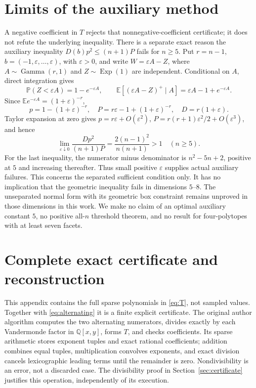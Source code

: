 \documentclass[11pt]{article}
\theoremstyle{remark}\newtheorem{remark}[theorem]{Remark}
\newcommand{\E}{\mathbb E}
\newcommand{\Prob}{\mathbb P}
\numberwithin{equation}{section}
\begin{document}
\section{Limits of the auxiliary method}\label{sec:limits}
A negative coefficient in $T$ rejects that nonnegative-coefficient
certificate; it does not refute the underlying inequality.
There is a separate exact reason the auxiliary inequality
$D(b)p^2\le(n+1)P$ fails for $n\ge5$.
Put $r=n-1$, $b=(-1,\varepsilon,\ldots,\varepsilon)$, with
$\varepsilon>0$, and write $W=\varepsilon A-Z$, where
$A\sim\operatorname{Gamma}(r,1)$ and $Z\sim\operatorname{Exp}(1)$
are independent. Conditional on $A$, direct integration gives
\[
 \Prob(Z<\varepsilon A)=1-e^{-\varepsilon A},\qquad
 \E[(\varepsilon A-Z)^+\mid A]=\varepsilon A-1+e^{-\varepsilon A}.
\]
Since $\E e^{-\varepsilon A}=(1+\varepsilon)^{-r}$,
\begin{equation}\label{eq:corner}
 p=1-(1+\varepsilon)^{-r},\quad
 P=r\varepsilon-1+(1+\varepsilon)^{-r},\quad
 D=r(1+\varepsilon).
\end{equation}
Taylor expansion at zero gives
$p=r\varepsilon+O(\varepsilon^2)$,
$P=r(r+1)\varepsilon^2/2+O(\varepsilon^3)$, and hence
\[
 \lim_{\varepsilon\downarrow0}\frac{Dp^2}{(n+1)P}
 =\frac{2(n-1)^2}{n(n+1)}>1\quad(n\ge5).
\]
For the last inequality, the numerator minus denominator is
$n^2-5n+2$, positive at $5$ and increasing thereafter.
Thus small positive $\varepsilon$ supplies actual auxiliary failures.
This concerns the separated sufficient condition only. It has no
implication that the geometric inequality fails in dimensions $5$--$8$.
The unseparated normal form with its geometric box constraint remains
unproved in those dimensions in this work. We make no claim of an
optimal auxiliary constant $5$, no positive all-$n$ threshold theorem,
and no result for four-polytopes with at least seven facets.

\appendix
\section{Complete exact certificate and reconstruction}\label{app:witness}
This appendix contains the full sparse polynomials in \eqref{eq:T},
not sampled values. Together with \eqref{eq:alternating} it is a finite
explicit certificate. The original author algorithm computes the two
alternating numerators, divides exactly by each Vandermonde factor in
$\mathbb Q[x,y]$, forms $T$, and checks coefficients. Its sparse
arithmetic stores exponent tuples and exact rational coefficients;
addition combines equal tuples, multiplication convolves exponents,
and exact division cancels lexicographic leading terms until the
remainder is zero. Nondivisibility is an error, not a discarded case.
The divisibility proof in Section~\ref{sec:certificate} justifies this
operation, independently of its execution.
\end{document}
